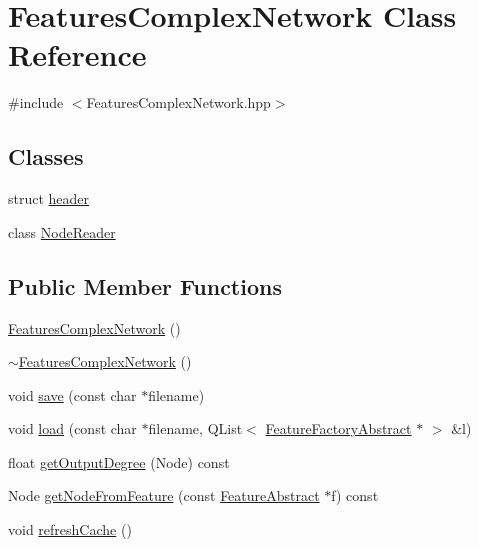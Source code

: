 \hypertarget{class_features_complex_network}{\section{Features\+Complex\+Network Class Reference}
\label{class_features_complex_network}
}


{\ttfamily \#include $<$Features\+Complex\+Network.\+hpp$>$}

\subsection*{Classes}
\begin{DoxyCompactItemize}
\item 
struct \hyperlink{struct_features_complex_network_1_1header}{header}
\item 
class \hyperlink{class_features_complex_network_1_1_node_reader}{Node\+Reader}
\end{DoxyCompactItemize}
\subsection*{Public Member Functions}
\begin{DoxyCompactItemize}
\item 
\hyperlink{class_features_complex_network_ad251cdf2e827d41e10c7b3fb1b2d8a22}{Features\+Complex\+Network} ()
\item 
\hyperlink{class_features_complex_network_a784109c6f62a250154d4b9add25b6409}{$\sim$\+Features\+Complex\+Network} ()
\item 
void \hyperlink{class_features_complex_network_a59981f76044a2b98eda4e69a20844ba0}{save} (const char $\ast$filename)
\item 
void \hyperlink{class_features_complex_network_a902200cb91800ddf8d4526914e4e5990}{load} (const char $\ast$filename, Q\+List$<$ \hyperlink{class_feature_factory_abstract}{Feature\+Factory\+Abstract} $\ast$ $>$ \&l)
\item 
float \hyperlink{class_features_complex_network_a8333b1bff644f2b8792bd4d033f89ece}{get\+Output\+Degree} (Node) const 
\item 
Node \hyperlink{class_features_complex_network_a87ac6a8c3d892a95c1183ee933ec51d3}{get\+Node\+From\+Feature} (const \hyperlink{class_feature_abstract}{Feature\+Abstract} $\ast$f) const 
\item 
void \hyperlink{class_features_complex_network_ae09eedea29313658b2158196d18967bb}{refresh\+Cache} ()
\end{DoxyCompactItemize}
